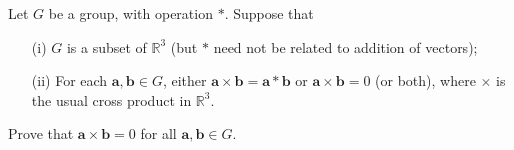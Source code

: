 Let $G$ be a group, with operation $*$. Suppose that
\begin{enumerate}
\item[(i)]
$G$ is a subset of $\mathbb{R}^3$ (but $*$ need not be related to addition of vectors);
\item[(ii)]
For each $\mathbf{a},\mathbf{b} \in G$, either $\mathbf{a}\times \mathbf{b} = \mathbf{a}*\mathbf{b}$
or $\mathbf{a}\times \mathbf{b} = 0$ (or
both), where $\times$ is the usual cross product in $\mathbb{R}^3$.
\end{enumerate}
Prove that $\mathbf{a} \times \mathbf{b} = 0$ for all $\mathbf{a}, \mathbf{b} \in G$.
